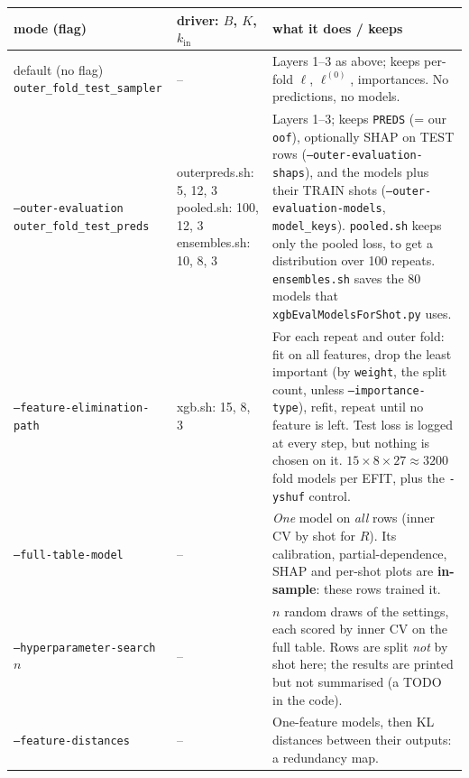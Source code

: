 \documentclass[11pt]{article}
\begin{document}
\begin{center}\small
\begin{tabular}{>{\raggedright\arraybackslash}p{3.9cm}>{\raggedright\arraybackslash}p{2.6cm}>{\raggedright\arraybackslash}p{8.9cm}}
\toprule
mode (flag) & driver: $B$, $K$, $k_{\text{in}}$ & what it does / keeps \\
\midrule
default (no flag) \newline \texttt{outer\_fold\_\allowbreak test\_sampler}
 & -- & Layers 1--3 as above; keeps per-fold $\ell$, $\ell^{(0)}$, importances. No predictions, no models.\\[3pt]
\texttt{--outer-evaluation} \newline \texttt{outer\_fold\_\allowbreak test\_preds}
 & outerpreds.sh: 5, 12, 3 \newline pooled.sh: 100, 12, 3 \newline ensembles.sh: 10, 8, 3
 & Layers 1--3; keeps \texttt{PREDS} (= our \texttt{oof}), optionally SHAP on TEST rows (\texttt{--outer-evaluation-shaps}), and the models plus their TRAIN shots (\texttt{--outer-evaluation-models}, \texttt{model\_keys}). \texttt{pooled.sh} keeps only the pooled loss, to get a distribution over 100 repeats. \texttt{ensembles.sh} saves the 80 models that \texttt{xgbEvalModelsForShot.py} uses.\\[3pt]
\texttt{--feature-}\newline\texttt{elimination-path}
 & xgb.sh: 15, 8, 3
 & For each repeat and outer fold: fit on all features, drop the least important (by \texttt{weight}, the split count, unless \texttt{--importance-type}), refit, repeat until no feature is left. Test loss is logged at every step, but nothing is chosen on it. $15\times8\times27\approx3200$ fold models per EFIT, plus the \texttt{-yshuf} control.\\[3pt]
\texttt{--full-table-model}
 & -- & \emph{One} model on \emph{all} rows (inner CV by shot for $R$). Its calibration, partial-dependence, SHAP and per-shot plots are \textbf{in-sample}: these rows trained it.\\[3pt]
\texttt{--hyperparameter-}\newline\texttt{search} $n$
 & -- & $n$ random draws of the settings, each scored by inner CV on the full table. Rows are split \emph{not} by shot here; the results are printed but not summarised (a TODO in the code).\\[3pt]
\texttt{--feature-distances}
 & -- & One-feature models, then KL distances between their outputs: a redundancy map.\\
\bottomrule
\end{tabular}
\end{center}
\end{document}

